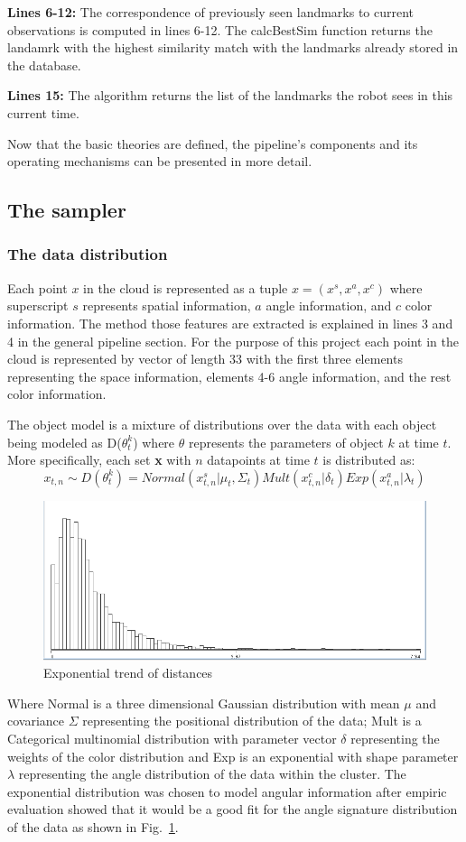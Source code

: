\documentclass[]{article}
\begin{document}
\textbf{Lines 6-12:} The correspondence of previously seen landmarks to current observations is computed in lines 6-12. The calcBestSim function returns the landamrk with the highest similarity match with the landmarks already stored in the database.

\textbf{Lines 15:} The algorithm returns the list of the landmarks the robot sees in this current time.

Now that the basic theories are defined, the pipeline's components and its operating mechanisms can be presented in more detail.

\subsection{The sampler}

\subsubsection{The data distribution}
\label{data:dist}

Each point $x$ in the cloud is represented as a tuple $x =(x^s, x^a, x^c) $ where superscript $s$ represents spatial information, $a$ angle information, and $c$ color information. The method those features are extracted is explained in lines 3 and 4 in the general pipeline section. For the purpose of this project each point in the cloud is represented by vector of length 33 with the first three elements representing the space information, elements 4-6 angle information, and the rest color information.

The object model is a mixture of distributions over the data with each object being modeled as D($\theta_t^k$) where $\theta$ represents the parameters of object $k$ at time $t$. More specifically, each set \textbf{x} with $n$ datapoints at time $t$ is distributed as:
$$ x_{t,n} \sim D(\theta_t^k) = Normal(x_{t,n}^s| \mu_t, \Sigma_t) Mult(x_{t,n}^c | \delta_t) Exp(x_{t,n}^a | \lambda_t) $$

\begin{figure}
    \centering
    \includegraphics[width=.25\textwidth]{Kullback-Leibler}
    \caption{Exponential trend of distances}
    \label{pcl:kl}
\end{figure}

Where Normal is a three dimensional Gaussian distribution with mean $\mu$ and covariance $\Sigma$ representing the positional distribution of the data; Mult is a Categorical multinomial distribution with parameter vector $\delta$ representing the weights of the color distribution and Exp is an exponential with shape parameter $\lambda$ representing the angle distribution of the data within the cluster. The exponential distribution was chosen to model angular information after empiric evaluation showed that it would be a good fit for the angle signature distribution of the data as shown in Fig.~\ref{pcl:kl}.
\end{document}
